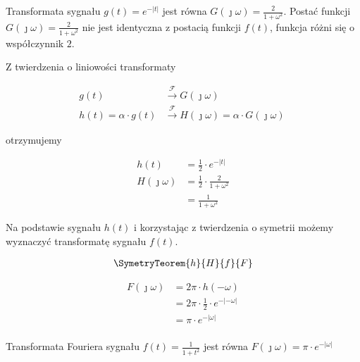 \begin{task}
Transformata sygnału $g(t) = e^{-\left|t\right|}$ jest równa $G(\jmath \omega)=\frac{2}{1+\omega^2}$. Postać funkcji $G(\jmath \omega)=\frac{2}{1+\omega^2}$ nie jest identyczna z postacią funkcji $f(t)$, funkcja różni się o współczynnik $2$. 

Z twierdzenia o liniowości transformaty 

\begin{align*}
g(t) &\xrightarrow{\mathcal F} G(\jmath \omega)\\
h(t)=\alpha \cdot g(t) &\xrightarrow{\mathcal F} H(\jmath \omega) = \alpha \cdot G(\jmath \omega)\
\end{align*}

otrzymujemy

\begin{align*}
h(t) &= \frac{1}{2} \cdot e^{-\left|t\right|}\\
H(\jmath \omega)&=\frac{1}{2} \cdot \frac{2}{1+\omega^2}\\
&=\frac{1}{1+\omega^2}
\end{align*}

Na podstawie sygnału $h(t)$ i korzystając z twierdzenia o symetrii możemy wyznaczyć transformatę sygnału $f(t)$.

\begin{align*}
\SymetryTeorem{h}{H}{f}{F}
\end{align*}

\begin{align*}
F(\jmath \omega)&=2\pi \cdot h(-\omega)\\
&=2\pi \cdot \frac{1}{2} \cdot e^{-\left|-\omega\right|}\\
&=\pi \cdot e^{-\left|\omega\right|}\\
\end{align*}

Transformata Fouriera sygnału $f(t)=\frac{1}{1+t^2}$ jest równa $F(\jmath \omega)=\pi \cdot e^{-\left|\omega\right|}$

\end{task}

